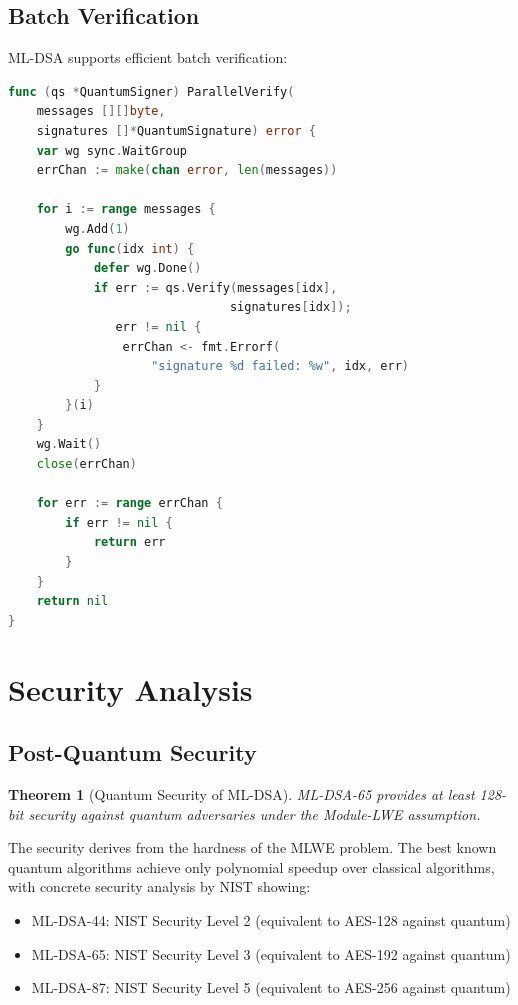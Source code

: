 \documentclass[11pt,a4paper]{article}
\newtheorem{theorem}{Theorem}
\begin{document}
\subsection{Batch Verification}

ML-DSA supports efficient batch verification:

\begin{lstlisting}[language=Go,caption={Batch Verification}]
func (qs *QuantumSigner) ParallelVerify(
    messages [][]byte,
    signatures []*QuantumSignature) error {
    var wg sync.WaitGroup
    errChan := make(chan error, len(messages))

    for i := range messages {
        wg.Add(1)
        go func(idx int) {
            defer wg.Done()
            if err := qs.Verify(messages[idx],
                               signatures[idx]);
               err != nil {
                errChan <- fmt.Errorf(
                    "signature %d failed: %w", idx, err)
            }
        }(i)
    }
    wg.Wait()
    close(errChan)

    for err := range errChan {
        if err != nil {
            return err
        }
    }
    return nil
}
\end{lstlisting}

\section{Security Analysis}

\subsection{Post-Quantum Security}

\begin{theorem}[Quantum Security of ML-DSA]
ML-DSA-65 provides at least 128-bit security against quantum adversaries under the Module-LWE assumption.
\end{theorem}

The security derives from the hardness of the MLWE problem. The best known quantum algorithms achieve only polynomial speedup over classical algorithms, with concrete security analysis by NIST showing:

\begin{itemize}
    \item ML-DSA-44: NIST Security Level 2 (equivalent to AES-128 against quantum)
    \item ML-DSA-65: NIST Security Level 3 (equivalent to AES-192 against quantum)
    \item ML-DSA-87: NIST Security Level 5 (equivalent to AES-256 against quantum)
\end{itemize}
\end{document}
